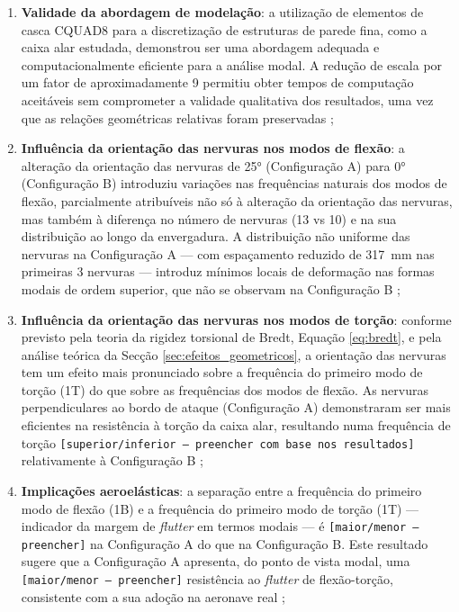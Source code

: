 \documentclass[a4paper,fleqn,noprintline]{cas-dc}
\begin{document}
\begin{enumerate}
    \item \textbf{Validade da abordagem de modelação}: a utilização de elementos de casca CQUAD8 para a discretização de estruturas de parede fina, como a caixa alar estudada, demonstrou ser uma abordagem adequada e computacionalmente eficiente para a análise modal. A redução de escala por um fator de aproximadamente 9 permitiu obter tempos de computação aceitáveis sem comprometer a validade qualitativa dos resultados, uma vez que as relações geométricas relativas foram preservadas \cite{Craig2006};

    \item \textbf{Influência da orientação das nervuras nos modos de flexão}: a alteração da orientação das nervuras de 25° (Configuração A) para 0° (Configuração B) introduziu variações nas frequências naturais dos modos de flexão, parcialmente atribuíveis não só à alteração da orientação das nervuras, mas também à diferença no número de nervuras (13 vs 10) e na sua distribuição ao longo da envergadura. A distribuição não uniforme das nervuras na Configuração A --- com espaçamento reduzido de \SI{317}{\milli\meter} nas primeiras 3 nervuras --- introduz mínimos locais de deformação nas formas modais de ordem superior, que não se observam na Configuração B \cite{Rao2011, Bathe2014};

    \item \textbf{Influência da orientação das nervuras nos modos de torção}: conforme previsto pela teoria da rigidez torsional de Bredt, Equação \eqref{eq:bredt}, e pela análise teórica da Secção \ref{sec:efeitos_geometricos}, a orientação das nervuras tem um efeito mais pronunciado sobre a frequência do primeiro modo de torção (1T) do que sobre as frequências dos modos de flexão. As nervuras perpendiculares ao bordo de ataque (Configuração A) demonstraram ser mais eficientes na resistência à torção da caixa alar, resultando numa frequência de torção \texttt{[superior/inferior --- preencher com base nos resultados]} relativamente à Configuração B \cite{Niu1988, Megson2012};

    \item \textbf{Implicações aeroelásticas}: a separação entre a frequência do primeiro modo de flexão (1B) e a frequência do primeiro modo de torção (1T) --- indicador da margem de \textit{flutter} em termos modais --- é \texttt{[maior/menor --- preencher]} na Configuração A do que na Configuração B. Este resultado sugere que a Configuração A apresenta, do ponto de vista modal, uma \texttt{[maior/menor --- preencher]} resistência ao \textit{flutter} de flexão-torção, consistente com a sua adoção na aeronave real \cite{Fung1993, Wright2015};


\end{enumerate}
\end{document}
